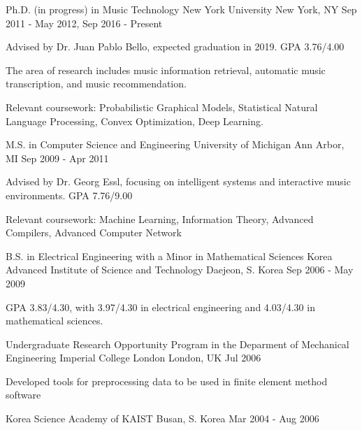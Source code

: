 \documentclass[12pt, a4paper]{awesome-cv}
\begin{document}
	
	\begin{cventries}
		\cventry
		{Ph.D. (in progress) in Music Technology}
		{New York University}
		{New York, NY}
		{Sep 2011 - May 2012, Sep 2016 - Present}
		{
			\begin{cvitems}
				\item Advised by Dr. Juan Pablo Bello, expected graduation in 2019. GPA 3.76/4.00
				\item The area of research includes music information retrieval, automatic music transcription, and music recommendation.
				\item Relevant coursework: Probabilistic Graphical Models, Statistical Natural Language Processing, Convex Optimization, Deep Learning.
			\end{cvitems}
		}
		\cventry
		{M.S. in Computer Science and Engineering}
		{University of Michigan}
		{Ann Arbor, MI}
		{Sep 2009 - Apr 2011}
		{
			\begin{cvitems}
				\item Advised by Dr. Georg Essl, focusing on intelligent systems and interactive music environments. GPA 7.76/9.00
				\item Relevant coursework: Machine Learning, Information Theory, Advanced Compilers, Advanced Computer Network
			\end{cvitems}
		}
		\cventry
		{B.S. in Electrical Engineering with a Minor in Mathematical Sciences}
		{Korea Advanced Institute of Science and Technology}
		{Daejeon, S. Korea}
		{Sep 2006 - May 2009}
		{
			\begin{cvitems}
				\item {GPA 3.83/4.30, with 3.97/4.30 in electrical engineering and 4.03/4.30 in mathematical sciences.}
			\end{cvitems}
		}
		\cventry
		{Undergraduate Research Opportunity Program in the Deparment of Mechanical Engineering}
		{Imperial College London}
		{London, UK}
		{Jul 2006}
		{
			\begin{cvitems}
				\item {Developed tools for preprocessing data to be used in finite element method software}
			\end{cvitems}
		}
		\cvsimpleentry
		{}
		{Korea Science Academy of KAIST}
		{Busan, S. Korea}
		{Mar 2004 - Aug 2006}
	\end{cventries}
\end{document}
